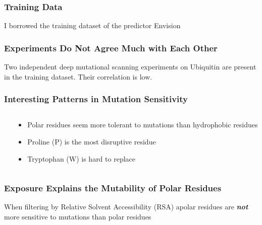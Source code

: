 \documentclass[10pt, british, luatex]{beamer}
\begin{document}
\begin{frame}
	\frametitle{Training Data}
	I borrowed the training dataset of the predictor Envision {\footnotesize\parencite{Gray2018}}
	\vfill%
	{%
		\let\bfseries\sbseries%
		
		
	}
\end{frame}

\begin{frame}
	\frametitle{Experiments Do Not Agree Much with Each Other}
	Two independent deep mutational scanning experiments on Ubiquitin are present in the training dataset.
	Their correlation is low.
	\vfill%
	\begin{center}
		{%
			\let\bfseries\sbseries%
			
		}
	\end{center}
\end{frame}

\begin{frame}
	\frametitle{Interesting Patterns in Mutation Sensitivity}
	\begin{columns}[c]
		\begin{column}{.5\textwidth}
			\vfill\vspace{-1.5em}\null%
			\begin{center}
				{%
					\let\bfseries\sbseries%
					
				}
			\end{center}
		\end{column}
		\begin{column}{.5\textwidth}
			\vspace{-7.5em}
			\begin{itemize}
				\item Polar residues seem more tolerant to mutations than hydrophobic residues
				\item Proline (P) is the most disruptive residue
				\item Tryptophan (W) is hard to replace
			\end{itemize}
		\end{column}
	\end{columns}
\end{frame}

\begin{frame}
	\frametitle{Exposure Explains the Mutability of Polar Residues}
	When filtering by Relative Solvent Accessibility (RSA) apolar residues are \textbf{\textit{not}} more sensitive to mutations than polar residues
	\vfill%
	\begin{center}
		{%
			\hspace{-2em}
			\let\bfseries\sbseries%
			
			\hspace{2em}%
			
		}
	\end{center}
\end{frame}
\end{document}
